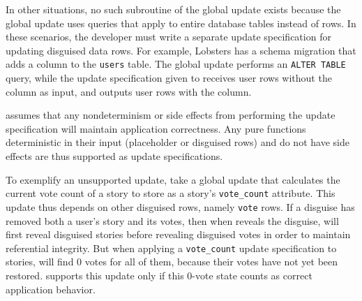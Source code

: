 %
In other situations, no such subroutine of the global update exists because the
global update uses queries that apply to entire database tables instead of rows.
In these scenarios, the developer must write a separate update specification for
updating disguised data rows.
%
For example, Lobsters has a schema migration that adds a column to the
\texttt{users} table.  The global update performs an \texttt{ALTER TABLE}
query, while the update specification given to \sys receives user rows without the column
as input, and outputs user rows with the column.
%

%
\sys assumes that any nondeterminism or side effects from performing the update
specification will maintain application correctness. Any pure functions
deterministic in their input (placeholder or disguised rows) and do not have
side effects are thus supported as update specifications.
%

%
To exemplify an unsupported update, take a global update that calculates the
current vote count of a story to store as a story's \texttt{vote\_count}
attribute. 
%
This update thus depends on other disguised rows, namely \texttt{vote} rows.
%
If a disguise has removed both a user's story and its votes,
then when \sys reveals the disguise, \sys will first reveal disguised 
stories before revealing disguised votes in order to maintain referential
integrity. 
%
But when applying a \texttt{vote\_count} update specification to 
stories, \sys will find 0 votes for all of them, because their votes have not yet been
restored.
%
\sys supports this update only if this 0-vote state counts as correct application behavior.
%


